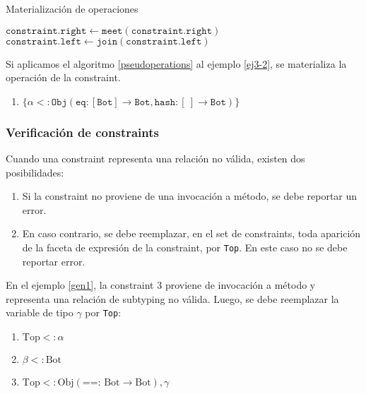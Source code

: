 \begin{algorithm}\captionsetup{labelsep=newline}
  \centering
  \caption{Materialización de operaciones}
  \label{pseudoperations}
    \begin{algorithmic}[1]
              \State $\mathtt{constraint.right\gets meet(constraint.right)}$
            \EndIf
              \State $\mathtt{constraint.left\gets join(constraint.left)}$
            \EndIf
          \EndFor
      \EndFunction
    \end{algorithmic}
\end{algorithm}

Si aplicamos el algoritmo \ref{pseudoperations} al ejemplo \ref{ej3-2}, se materializa la operación de la constraint.

\begin{enumerate}
  \item $\mathtt{\{\alpha <: Obj(eq : [Bot] \rightarrow Bot, hash : [\ ] \rightarrow Bot)\}}$
\end{enumerate}

\subsubsection{Verificación de constraints}
Cuando una constraint representa una relación no válida, existen dos posibilidades:

\begin{enumerate}
  \item Si la constraint no proviene de una invocación a método, se debe reportar un error.
  \item En caso contrario, se debe reemplazar, en el set de constraints, toda aparición de la faceta de expresión de la constraint, por \texttt{Top}. En este caso no se debe reportar error.
\end{enumerate}

En el ejemplo \ref{gen1}, la constraint 3 proviene de invocación a método y representa una relación de subtyping no válida. Luego, se debe reemplazar la variable de tipo $\gamma$ por \texttt{Top}:

\begin{enumerate}
  \item $\text{Top} <: \alpha$
  \item $\beta <: \text{Bot}$
  \item $\text{Top} <: \text{Obj}(\text{==: }\text{Bot} \rightarrow \text{Bot}), \gamma$
\end{enumerate}

